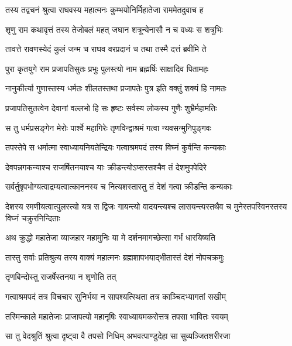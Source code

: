 
\twolineshloka
{तस्य तद्वचनं श्रुत्वा राघवस्य महात्मनः}
{कुम्भयोनिर्मिहातेजा राममेतदुवाच ह} %

\twolineshloka
{शृणु राम कथावृत्तं तस्य तेजोबलं महत्}
{जघान शत्रून्येनासौ न च वध्यः स शत्रुभिः} %

\twolineshloka
{तावत्ते रावणस्येदं कुलं जन्म च राघव}
{वरप्रदानं च तथा तस्मै दत्तं ब्रवीमि ते} %

\twolineshloka
{पुरा कृतयुगे राम प्रजापतिसुतः प्रभुः}
{पुलस्त्यो नाम ब्रह्मर्षिः साक्षादिव पितामहः} %

\twolineshloka
{नानुकीर्त्या गुणास्तस्य धर्मतः शीलतस्तथा}
{प्रजापतेः पुत्र इति वक्तुं शक्यं हि नामतः} %

\twolineshloka
{प्रजापतिसुतत्वेन देवानां वल्लभो हि सः}
{हृष्टः सर्वस्य लोकस्य गुणैः शुभ्रैर्महामतिः} %

\twolineshloka
{स तु धर्मप्रसङ्गेन मेरोः पार्श्वे महागिरेः}
{तृणविन्द्वाश्रमं गत्वा न्यवसन्मुनिपुङ्गवः} %

\twolineshloka
{तपस्तेपे स धर्मात्मा स्वाध्यायनियतेन्द्रियः}
{गत्वाश्रमपदं तस्य विघ्नं कुर्वन्ति कन्यकाः} %

\twolineshloka
{देवपन्नगकन्याश्च राजर्षितनयाश्च याः}
{क्रीडन्त्योऽप्सरसश्चैव तं देशमुपपेदिरे} %

\twolineshloka
{सर्वर्तुषृपभोग्यत्वाद्रम्यत्वात्काननस्य च}
{नित्यशस्तास्तु तं देशं गत्वा क्रीडन्ति कन्यकाः} %

\threelineshloka
{देशस्य रमणीयत्वात्पुलस्त्यो यत्र स द्विजः}
{गायन्त्यो वादयन्त्यश्च लासयन्त्यस्तथैव च}
{मुनेस्तपस्विनस्तस्य विघ्नं चक्रुरनिन्दिताः} %

\twolineshloka
{अथ क्रुद्धो महातेजा व्याजहार महामुनिः}
{या मे दर्शनमागच्छेत्सा गर्भं धारयिष्यति} %

\twolineshloka
{तास्तु सर्वाः प्रतिश्रुत्य तस्य वाक्यं महात्मनः}
{ब्रह्मशापभयाद्भीतास्तं देशं नोपचक्रमुः} %

\onelineshloka
{तृणबिन्दोस्तु राजर्षेस्तनया न शृणोति तत्} %

\twolineshloka
{गत्वाश्रमपदं तत्र विचचार सुनिर्भया}
{न सापश्यत्स्थिता तत्र काञ्चिदभ्यागतां सखीम्} %

\twolineshloka
{तस्मिन्काले महातेजाः प्राजापत्यो महानृषिः}
{स्वाध्यायमकरोत्तत्र तपसा भावितः स्वयम्} %

\twolineshloka
{सा तु वेदश्रुतिं श्रुत्वा दृष्ट्वा वै तपसो निधिम्}
{अभवत्पाण्डुदेहा सा सुव्यञ्जितशरीरजा} %


